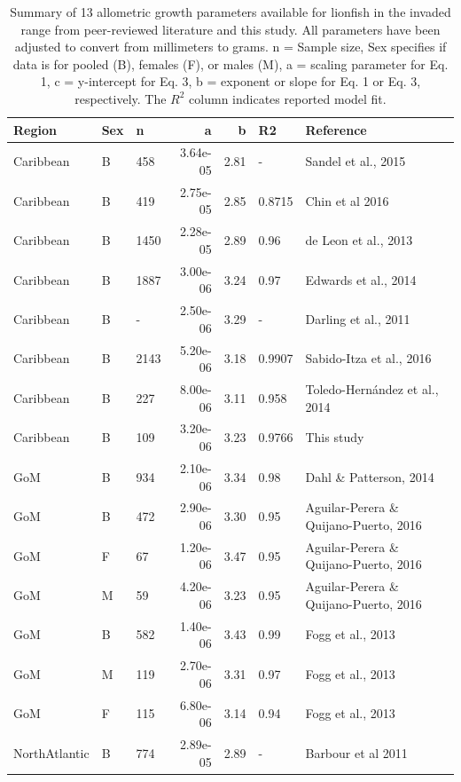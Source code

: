 \documentclass[fleqn,10pt,lineno]{wlpeerj} %
\theoremstyle{definition}
\theoremstyle{definition}
\theoremstyle{definition}
\theoremstyle{remark}
\begin{document}
\begin{table}

\caption{\label{tab:unnamed-chunk-4}\label{tab:all_params}Summary of 13 allometric growth parameters available for lionfish in the invaded range from peer-reviewed literature and this study. All parameters have been adjusted to convert from millimeters to grams. n = Sample size, Sex specifies if data is for pooled (B), females (F), or males (M), a = scaling parameter for Eq. 1, c = y-intercept for Eq. 3, b = exponent or slope for Eq. 1 or Eq. 3, respectively. The $R^2$ column indicates reported model fit.}
\centering
\begin{tabular}[t]{lllrrll}
\toprule
Region & Sex & n & a & b & R2 & Reference\\
\midrule
Caribbean & B & 458 & 3.64e-05 & 2.81 & - & Sandel et al., 2015\\
Caribbean & B & 419 & 2.75e-05 & 2.85 & 0.8715 & Chin et al 2016\\
Caribbean & B & 1450 & 2.28e-05 & 2.89 & 0.96 & de Leon et al., 2013\\
Caribbean & B & 1887 & 3.00e-06 & 3.24 & 0.97 & Edwards et al., 2014\\
Caribbean & B & - & 2.50e-06 & 3.29 & - & Darling et al., 2011\\
\addlinespace
Caribbean & B & 2143 & 5.20e-06 & 3.18 & 0.9907 & Sabido-Itza et al., 2016\\
Caribbean & B & 227 & 8.00e-06 & 3.11 & 0.958 & Toledo-Hernández et al., 2014\\
Caribbean & B & 109 & 3.20e-06 & 3.23 & 0.9766 & This study\\
GoM & B & 934 & 2.10e-06 & 3.34 & 0.98 & Dahl \& Patterson, 2014\\
GoM & B & 472 & 2.90e-06 & 3.30 & 0.95 & Aguilar-Perera \& Quijano-Puerto, 2016\\
\addlinespace
GoM & F & 67 & 1.20e-06 & 3.47 & 0.95 & Aguilar-Perera \& Quijano-Puerto, 2016\\
GoM & M & 59 & 4.20e-06 & 3.23 & 0.95 & Aguilar-Perera \& Quijano-Puerto, 2016\\
GoM & B & 582 & 1.40e-06 & 3.43 & 0.99 & Fogg et al., 2013\\
GoM & M & 119 & 2.70e-06 & 3.31 & 0.97 & Fogg et al., 2013\\
GoM & F & 115 & 6.80e-06 & 3.14 & 0.94 & Fogg et al., 2013\\
NorthAtlantic & B & 774 & 2.89e-05 & 2.89 & - & Barbour et al 2011\\
\bottomrule
\end{tabular}
\end{table}
\end{document}
